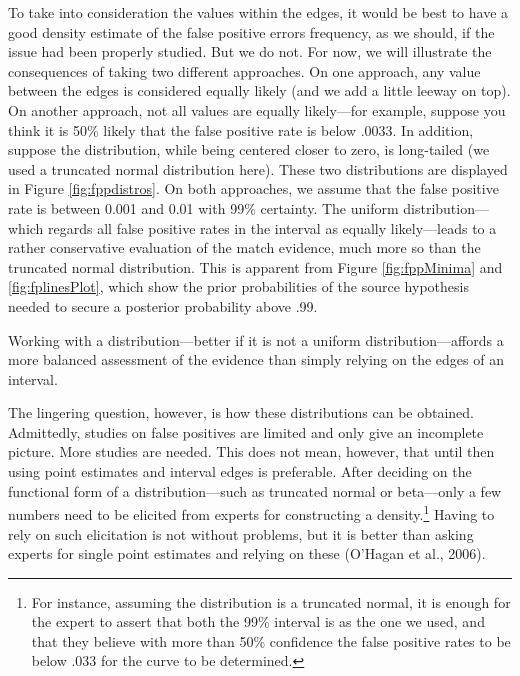 \documentclass[
  10pt,
  dvipsnames,enabledeprecatedfontcommands]{scrartcl}
\begin{document}
To take into consideration the values within the edges, it would be best
to have a good density estimate of the false positive errors frequency,
as we should, if the issue had been properly studied. But we do not. For
now, we will illustrate the consequences of taking two different
approaches. On one approach, any value between the edges is considered
equally likely (and we add a little leeway on top). On another approach,
not all values are equally likely---for example, suppose you think it is
50\% likely that the false positive rate is below .0033. In addition,
suppose the distribution, while being centered closer to zero, is
long-tailed (we used a truncated normal distribution here). These two
distributions are displayed in Figure \ref{fig:fppdistros}. On both
approaches, we assume that the false positive rate is between 0.001 and
0.01 with 99\% certainty. The uniform distribution---which regards all
false positive rates in the interval as equally likely---leads to a
rather conservative evaluation of the match evidence, much more so than
the truncated normal distribution. This is apparent from Figure
\ref{fig:fppMinima} and \ref{fig:fplinesPlot}, which show the prior
probabilities of the source hypothesis needed to secure a posterior
probability above .99.

Working with a distribution---better if it is not a uniform
distribution---affords a more balanced assessment of the evidence than
simply relying on the edges of an interval.

The lingering question, however, is how these distributions can be
obtained. Admittedly, studies on false positives are limited and only
give an incomplete picture. More studies are needed. This does not mean,
however, that until then using point estimates and interval edges is
preferable. After deciding on the functional form of a
distribution---such as truncated normal or beta---only a few numbers
need to be elicited from experts for constructing a density.\footnote{For
  instance, assuming the distribution is a truncated normal, it is
  enough for the expert to assert that both the 99\% interval is as the
  one we used, and that they believe with more than 50\% confidence the
  false positive rates to be below \(.033\) for the curve to be
  determined.} Having to rely on such elicitation is not without
problems, but it is better than asking experts for single point
estimates and relying on these (O'Hagan et al., 2006).
\end{document}
